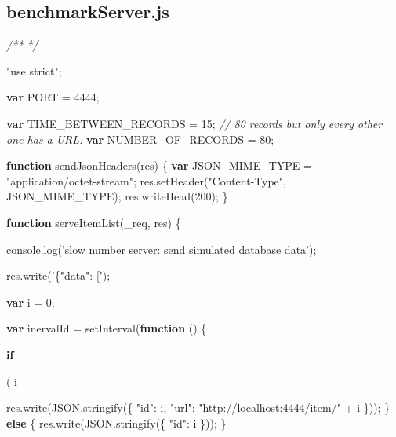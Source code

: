 \documentclass[]{article}
\newenvironment{Shaded}{}{}
\newcommand{\KeywordTok}[1]{\textcolor[rgb]{0.00,0.44,0.13}{\textbf{{#1}}}}
\newcommand{\DecValTok}[1]{\textcolor[rgb]{0.25,0.63,0.44}{{#1}}}
\newcommand{\StringTok}[1]{\textcolor[rgb]{0.25,0.44,0.63}{{#1}}}
\newcommand{\CommentTok}[1]{\textcolor[rgb]{0.38,0.63,0.69}{\textit{{#1}}}}
\newcommand{\OtherTok}[1]{\textcolor[rgb]{0.00,0.44,0.13}{{#1}}}
\newcommand{\FunctionTok}[1]{\textcolor[rgb]{0.02,0.16,0.49}{{#1}}}
\newcommand{\NormalTok}[1]{{#1}}
\begin{document}
\pagebreak

\subsection{benchmarkServer.js}

\begin{Shaded}
\begin{Highlighting}[]
\CommentTok{/**   }
\CommentTok{ */}

\StringTok{"use strict"}\NormalTok{;}

\KeywordTok{var} \NormalTok{PORT = }\DecValTok{4444}\NormalTok{;}

\KeywordTok{var} \NormalTok{TIME_BETWEEN_RECORDS = }\DecValTok{15}\NormalTok{;}
\CommentTok{// 80 records but only every other one has a URL:}
\KeywordTok{var} \NormalTok{NUMBER_OF_RECORDS = }\DecValTok{80}\NormalTok{;}

\KeywordTok{function} \FunctionTok{sendJsonHeaders}\NormalTok{(res) \{}
   \KeywordTok{var} \NormalTok{JSON_MIME_TYPE = }\StringTok{"application/octet-stream"}\NormalTok{;}
   \OtherTok{res}\NormalTok{.}\FunctionTok{setHeader}\NormalTok{(}\StringTok{"Content-Type"}\NormalTok{, JSON_MIME_TYPE);}
   \OtherTok{res}\NormalTok{.}\FunctionTok{writeHead}\NormalTok{(}\DecValTok{200}\NormalTok{);}
\NormalTok{\}}

\KeywordTok{function} \FunctionTok{serveItemList}\NormalTok{(_req, res) \{}

   \OtherTok{console}\NormalTok{.}\FunctionTok{log}\NormalTok{(}\StringTok{'slow number server: send simulated database data'}\NormalTok{);}

   \OtherTok{res}\NormalTok{.}\FunctionTok{write}\NormalTok{(}\StringTok{'\{"data": ['}\NormalTok{);}

   \KeywordTok{var} \NormalTok{i = }\DecValTok{0}\NormalTok{;}

   \KeywordTok{var} \NormalTok{inervalId = }\FunctionTok{setInterval}\NormalTok{(}\KeywordTok{function} \NormalTok{() \{}

      \KeywordTok{if}\NormalTok{( i %

         \OtherTok{res}\NormalTok{.}\FunctionTok{write}\NormalTok{(}\OtherTok{JSON}\NormalTok{.}\FunctionTok{stringify}\NormalTok{(\{}
            \StringTok{"id"}\NormalTok{: i,}
            \StringTok{"url"}\NormalTok{: }\StringTok{"http://localhost:4444/item/"} \NormalTok{+ i         }
         \NormalTok{\}));}
      \NormalTok{\} }\KeywordTok{else} \NormalTok{\{}
         \OtherTok{res}\NormalTok{.}\FunctionTok{write}\NormalTok{(}\OtherTok{JSON}\NormalTok{.}\FunctionTok{stringify}\NormalTok{(\{}
            \StringTok{"id"}\NormalTok{: i         }
         \NormalTok{\}));      }
      \NormalTok{\}}
      
}
\end{Highlighting}
\end{Shaded}
\end{document}
